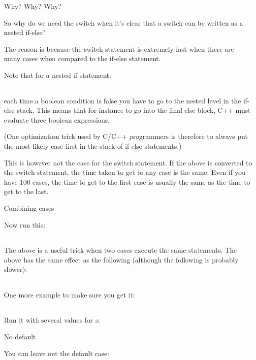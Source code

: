\documentclass[
]{article}
\begin{document}
Why? Why? Why?

So why do we need the switch when it's clear that a switch can be
written as a nested if-else?

The reason is because the switch statement is extremely fast when there
are many cases when compared to the if-else statement.

Note that for a nested if statement:

\begin{longtable}[]{@{}@{}}
\toprule
\endhead
\bottomrule
\end{longtable}

each time a boolean condition is false you have to go to the nested
level in the if-else stack. This means that for instance to go into the
final else block, C++ must evaluate three boolean expressions.

(One optimization trick used by C/C++ programmers is therefore to always
put the most likely case first in the stack of if-else statements.)

This is however not the case for the switch statement. If the above is
converted to the switch statement, the time taken to get to any case is
the same. Even if you have 100 cases, the time to get to the first case
is usually the same as the time to get to the last.

Combining cases

Now run this:

\begin{longtable}[]{@{}@{}}
\toprule
\endhead
\bottomrule
\end{longtable}

The above is a useful trick when two cases execute the same statements.
The above has the same effect as the following (although the following
is probably slower):

\begin{longtable}[]{@{}@{}}
\toprule
\endhead
\bottomrule
\end{longtable}

One more example to make sure you get it:

\begin{longtable}[]{@{}@{}}
\toprule
\endhead
\bottomrule
\end{longtable}

Run it with several values for \emph{x}.

No default

You can leave out the default case:

\begin{longtable}[]{@{}@{}}
\toprule
\endhead
\bottomrule
\end{longtable}
\end{document}
